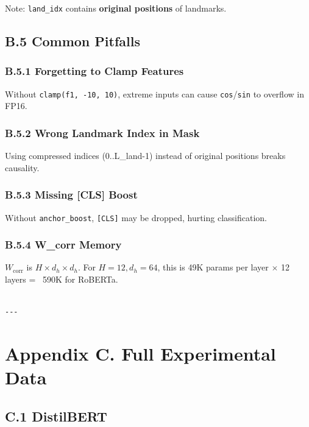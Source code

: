 Note: \texttt{land\_idx} contains \textbf{original positions} of landmarks.

\subsection{B.5 Common Pitfalls}

\subsubsection{B.5.1 Forgetting to Clamp Features}

Without \texttt{clamp(f1, -10, 10)}, extreme inputs can cause \texttt{cos}/\texttt{sin} to 
overflow in FP16.

\subsubsection{B.5.2 Wrong Landmark Index in Mask}

Using compressed indices (0..L\_land-1) instead of original positions 
breaks causality.

\subsubsection{B.5.3 Missing [CLS] Boost}

Without \texttt{anchor\_boost}, \texttt{[CLS]} may be dropped, hurting classification.

\subsubsection{B.5.4 W\_corr Memory}

$W_\text{corr}$ is $H \times d_h \times d_h$. For $H = 12, d_h = 64$, 
this is 49K params per layer $\times$ 12 layers = ~590K for RoBERTa.
\begin{lstlisting}

---
\end{lstlisting}

\section{Appendix C. Full Experimental Data}

\subsection{C.1 DistilBERT}

